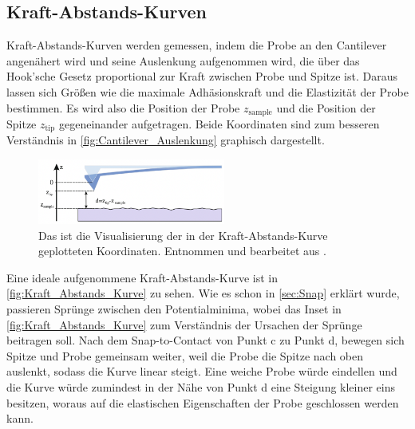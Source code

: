 \subsection{Kraft-Abstands-Kurven}
    Kraft-Abstands-Kurven werden gemessen, indem die Probe an den Cantilever angenähert wird und seine Auslenkung aufgenommen wird, die über das Hook'sche Gesetz proportional zur Kraft zwischen Probe und Spitze ist.
    Daraus lassen sich Größen wie die maximale Adhäsionskraft und die Elastizität der Probe bestimmen.
    Es wird also die Position der Probe $z_{\mathrm{sample}}$ und die Position der Spitze $z_{\mathrm{tip}}$ gegeneinander aufgetragen.
    Beide Koordinaten sind zum besseren Verständnis in \autoref{fig:Cantilever_Auslenkung} graphisch dargestellt.
    \begin{figure}[ht]
        \centering\captionsetup{format=plain}
        \includegraphics[width=0.55\textwidth]{bilder/Cantilever_Auslenkung.png}
        \caption{Das ist die Visualisierung der in der Kraft-Abstands-Kurve geplotteten Koordinaten. Entnommen und bearbeitet aus \cite{voigtlaender}.}
        \label{fig:Cantilever_Auslenkung}
    \end{figure}
    \FloatBarrier
    Eine ideale aufgenommene Kraft-Abstands-Kurve ist in \autoref{fig:Kraft_Abstands_Kurve} zu sehen.
    Wie es schon in \autoref{sec:Snap} erklärt wurde, passieren Sprünge zwischen den Potentialminima, wobei das Inset in \autoref{fig:Kraft_Abstands_Kurve} zum Verständnis der Ursachen der Sprünge beitragen soll.
    Nach dem Snap-to-Contact von Punkt c zu Punkt d, bewegen sich Spitze und Probe gemeinsam weiter, weil die Probe die Spitze nach oben auslenkt, sodass die Kurve linear steigt.
    Eine weiche Probe würde eindellen und die Kurve würde zumindest in der Nähe von Punkt d eine Steigung kleiner eins besitzen, woraus auf die elastischen Eigenschaften der Probe geschlossen werden kann.
    \vspace{-2cm}
